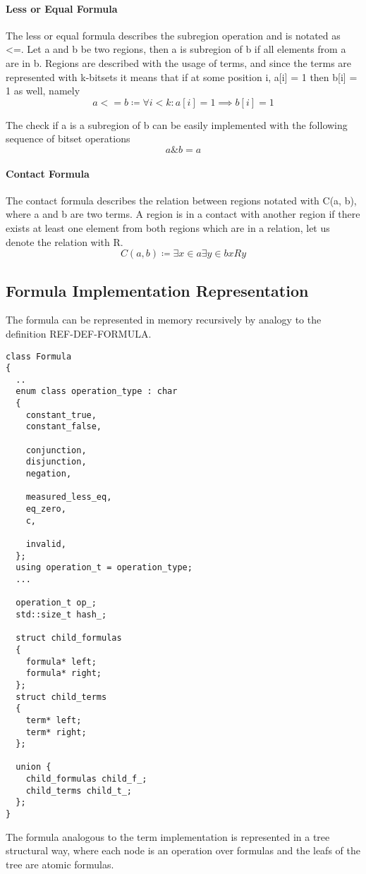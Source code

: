 \documentclass{article}
\begin{document}
	\paragraph{Less or Equal Formula} The less or equal formula describes the subregion operation and is notated as <=.
	Let a and b be two regions, then a is subregion of b if all elements from a are in b.
	Regions are described with the usage of terms, and since the terms are represented with k-bitsets it means that 
	if at some position i, a[i] = 1 then b[i] = 1 as well, namely
	\begin{equation}
		a <= b \coloneqq \forall i < k : a[i] = 1 \implies b[i]=1
	\end{equation}

	The check if a is a subregion of b can be easily implemented with the following sequence of bitset operations
	\begin{equation}
		a \& b = a
	\end{equation}

	\paragraph{Contact Formula} The contact formula describes the relation between regions notated with C(a, b), where a and b are two terms.
	A region is in a contact with another region if there exists at least one element from both regions which are in a relation, let us denote the relation with R.
	\begin{equation}
		C(a, b) \coloneqq \exists x \in a \exists y \in b xRy
	\end{equation}

	\subsection*{Formula Implementation Representation}
	The formula can be represented in memory recursively by analogy to the definition REF-DEF-FORMULA.

	\begin{lstlisting}
class Formula 
{
  ..
  enum class operation_type : char
  {
    constant_true,
    constant_false,

    conjunction,
    disjunction,
    negation,

    measured_less_eq,
    eq_zero,
    c,

    invalid,
  };
  using operation_t = operation_type;
  ...

  operation_t op_;
  std::size_t hash_;
    
  struct child_formulas
  {
    formula* left;
    formula* right;
  };
  struct child_terms
  {
    term* left;
    term* right;
  };

  union {
    child_formulas child_f_;
    child_terms child_t_;
  };
}
	\end{lstlisting}
	The formula analogous to the term implementation is represented in a tree structural way, where each node is an operation over formulas and the leafs of the tree
	are atomic formulas. 
\end{document}
